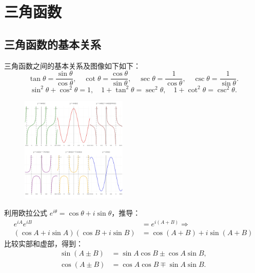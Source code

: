 \documentclass[8pt,a4paper,twoside]{tau-class/tau}
\begin{document}
\newpage
\section{三角函数}
\subsection{三角函数的基本关系}
三角函数之间的基本关系及图像如下如下：
\[
  \tan\theta = \frac{\sin\theta}{\cos\theta},\quad
  \cot\theta = \frac{\cos\theta}{\sin\theta},\quad
  \sec\theta = \frac{1}{\cos\theta},\quad
  \csc\theta = \frac{1}{\sin\theta}.
\]
\[
  \sin^2\theta + \cos^2\theta = 1,\quad
  1+\tan^2\theta = \sec^2\theta,\quad
  1+\cot^2\theta = \csc^2\theta.
\]

\begin{figure}[h]
    \centering
    \includegraphics[width=0.45\textwidth]{figures/trig.png}
    \label{fig:trig_functions}
\end{figure}

\begin{tcolorbox}[enhanced, breakable, boxsep=1pt, colframe=blue!50!black, colback=white, fonttitle=\footnotesize, fontupper=\footnotesize, title=和差公式推导（利用欧拉公式推导考纲不做要求）]
利用欧拉公式 \(e^{i\theta}=\cos\theta+i\sin\theta\)，推导：
\[
\begin{aligned}
e^{iA}e^{iB} &= e^{i(A+B)} \Rightarrow \\
(\cos A + i\sin A)(\cos B + i\sin B) &= \cos(A+B) + i\sin(A+B)
\end{aligned}
\]
比较实部和虚部，得到：
\begin{align*}
  \sin(A\pm B) &= \sin A\cos B \pm \cos A\sin B,\\[5pt]
  \cos(A\pm B) &= \cos A\cos B \mp \sin A\sin B.
\end{align*}
\end{tcolorbox}
\end{document}
